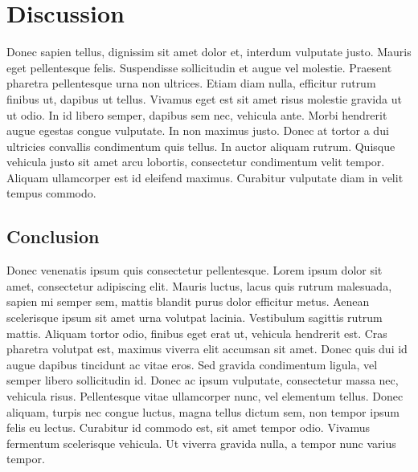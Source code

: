 \section{Discussion}
\label{sec:5}

Donec sapien tellus, dignissim sit amet dolor et, interdum vulputate justo. Mauris eget pellentesque felis. Suspendisse sollicitudin et augue vel molestie. Praesent pharetra pellentesque urna non ultrices. Etiam diam nulla, efficitur rutrum finibus ut, dapibus ut tellus. Vivamus eget est sit amet risus molestie gravida ut ut odio. In id libero semper, dapibus sem nec, vehicula ante. Morbi hendrerit augue egestas congue vulputate. In non maximus justo. Donec at tortor a dui ultricies convallis condimentum quis tellus. In auctor aliquam rutrum. Quisque vehicula justo sit amet arcu lobortis, consectetur condimentum velit tempor. Aliquam ullamcorper est id eleifend maximus. Curabitur vulputate diam in velit tempus commodo.

\subsection{Conclusion}

Donec venenatis ipsum quis consectetur pellentesque. Lorem ipsum dolor sit amet, consectetur adipiscing elit. Mauris luctus, lacus quis rutrum malesuada, sapien mi semper sem, mattis blandit purus dolor efficitur metus. Aenean scelerisque ipsum sit amet urna volutpat lacinia. Vestibulum sagittis rutrum mattis. Aliquam tortor odio, finibus eget erat ut, vehicula hendrerit est. Cras pharetra volutpat est, maximus viverra elit accumsan sit amet. Donec quis dui id augue dapibus tincidunt ac vitae eros. Sed gravida condimentum ligula, vel semper libero sollicitudin id. Donec ac ipsum vulputate, consectetur massa nec, vehicula risus. Pellentesque vitae ullamcorper nunc, vel elementum tellus. Donec aliquam, turpis nec congue luctus, magna tellus dictum sem, non tempor ipsum felis eu lectus. Curabitur id commodo est, sit amet tempor odio. Vivamus fermentum scelerisque vehicula. Ut viverra gravida nulla, a tempor nunc varius tempor.
